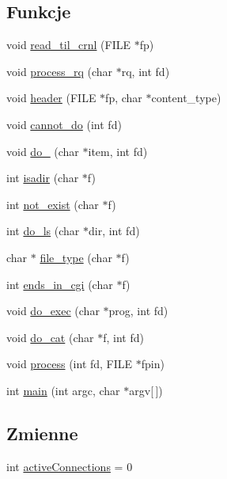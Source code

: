 \subsection*{Funkcje}
\begin{DoxyCompactItemize}
\item 
void \mbox{\hyperlink{serwer-www_8c_aec3402ec3244a54e1bc086a1e1054755}{read\+\_\+til\+\_\+crnl}} (F\+I\+LE $\ast$fp)
\item 
void \mbox{\hyperlink{serwer-www_8c_ad8ba6d5e4a00c2fff7a65af14096bd9b}{process\+\_\+rq}} (char $\ast$rq, int fd)
\item 
void \mbox{\hyperlink{serwer-www_8c_adc7bfb1c892aecf61c0c73f3458caf90}{header}} (F\+I\+LE $\ast$fp, char $\ast$content\+\_\+type)
\item 
void \mbox{\hyperlink{serwer-www_8c_a8e603d6f76a35b616135eb394f6ec080}{cannot\+\_\+do}} (int fd)
\item 
void \mbox{\hyperlink{serwer-www_8c_ad3f91122750391e238cfbee3b88975ec}{do\+\_}} (char $\ast$item, int fd)
\item 
int \mbox{\hyperlink{serwer-www_8c_a68ac50fc5196973b9f3ef7b4992f7279}{isadir}} (char $\ast$f)
\item 
int \mbox{\hyperlink{serwer-www_8c_a963f754c08801de5f56c78f1b26e3a86}{not\+\_\+exist}} (char $\ast$f)
\item 
int \mbox{\hyperlink{serwer-www_8c_a83999b0603c38aa5fe08f7ed801e6cfe}{do\+\_\+ls}} (char $\ast$dir, int fd)
\item 
char $\ast$ \mbox{\hyperlink{serwer-www_8c_a29b9ee72561809560e62a9ea307d1ff6}{file\+\_\+type}} (char $\ast$f)
\item 
int \mbox{\hyperlink{serwer-www_8c_ad3ef3c593d3a792b02a341450eaa62dd}{ends\+\_\+in\+\_\+cgi}} (char $\ast$f)
\item 
void \mbox{\hyperlink{serwer-www_8c_a0a305ff573da158eaa9484e5506921c0}{do\+\_\+exec}} (char $\ast$prog, int fd)
\item 
void \mbox{\hyperlink{serwer-www_8c_adab7e9f2617cceb5752ef3f97cfc2ef1}{do\+\_\+cat}} (char $\ast$f, int fd)
\item 
void \mbox{\hyperlink{serwer-www_8c_a182f39efe710f6e9bf678baa9e8eafa3}{process}} (int fd, F\+I\+LE $\ast$fpin)
\item 
int \mbox{\hyperlink{serwer-www_8c_a0ddf1224851353fc92bfbff6f499fa97}{main}} (int argc, char $\ast$argv\mbox{[}$\,$\mbox{]})
\end{DoxyCompactItemize}
\subsection*{Zmienne}
\begin{DoxyCompactItemize}
\item 
int \mbox{\hyperlink{serwer-www_8c_a1f5bcbe2b6bbbf057f1e857d6466ac34}{active\+Connections}} = 0
\end{DoxyCompactItemize}



